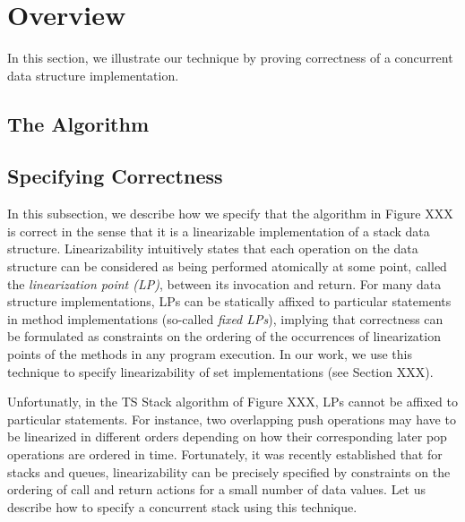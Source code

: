\section{Overview}
\label{sec:overview}

In this section, we illustrate our technique by proving correctness of
a concurrent data structure implementation.

\subsection{The Algorithm}





\subsection{Specifying Correctness}
In this subsection, we describe how we specify that the algorithm in Figure XXX
is correct in the sense that it is a linearizable implementation of a
stack data structure. Linearizability intuitively states that
each operation on the data structure can be considered as being
performed atomically at some point, called the {\em linearization point (LP)},
between its invocation and return.
For many data structure implementations, LPs can be statically
affixed to particular statements in method implementations (so-called
{\em fixed LPs}),
implying that correctness can be formulated as constraints on the ordering of the
occurrences of linearization points of the methods in any program
execution.
In our work, we use this technique to specify linearizability of
set implementations (see Section XXX).

Unfortunatly, in the TS Stack algorithm of Figure XXX, LPs cannot be affixed
to particular statements. For instance,  two overlapping
push operations may have to be linearized in different orders depending
on how their corresponding later pop operations are ordered in time.
Fortunately, it was recently established that for stacks and
queues, linearizability can be precisely specified by
constraints on the ordering of call and return actions for a small number
of data values. Let us describe how to specify a concurrent stack using
this technique.

